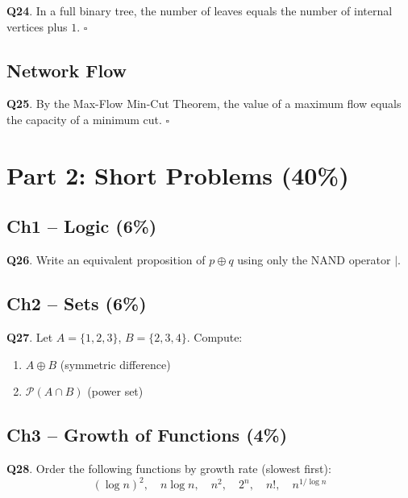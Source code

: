 \documentclass[11pt,a4paper,fontset=mac]{ctexart}
\newcommand{\tfblank}{$\square$}
\newcommand{\question}[1]{\textbf{Q#1}.}
\begin{document}
\question{24}  In a full binary tree, the number of leaves equals the
number of internal vertices plus $1$.
\hfill\tfblank

\subsection*{Network Flow}

\question{25}  By the Max-Flow Min-Cut Theorem, the value of a maximum
flow equals the capacity of a minimum cut.
\hfill\tfblank

\section*{Part 2: Short Problems (40\%)}

\subsection*{Ch1 -- Logic (6\%)}

\question{26}  Write an equivalent proposition of $p\oplus q$ using only
the NAND operator $\mid$.\bigskip

\subsection*{Ch2 -- Sets (6\%)}

\question{27}  Let $A=\{1,2,3\}$, $B=\{2,3,4\}$. Compute:
\begin{enumerate}[label=(\alph*)]
  \item $A\oplus B$ (symmetric difference)
  \item $\mathcal{P}(A\cap B)$ (power set)
\end{enumerate}
\bigskip

\subsection*{Ch3 -- Growth of Functions (4\%)}

\question{28}  Order the following functions by growth rate (slowest first):
\[
(\log n)^{2},\quad n\log n,\quad n^{2},\quad 2^{n},\quad n!,\quad n^{1/\log n}
\]
\bigskip

\end{document}
